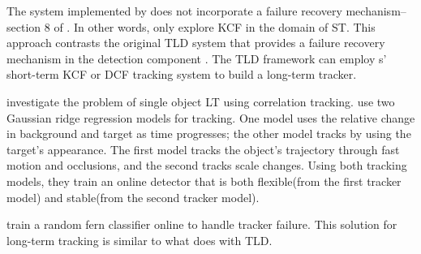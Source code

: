 The system implemented by \citeauthor{Enriques2014} does not incorporate a failure recovery mechanism--section 8 of \cite{Enriques2014}.
In other words, \citeauthor{Enriques2014} only explore KCF in the domain of ST.
This approach contrasts the original TLD system that provides a failure recovery mechanism in the detection component \cite{Kalal2011}.
The TLD framework can employ \citeauthor{Enriques2014}s' short-term KCF or DCF tracking system  to build a long-term tracker.

\citet{Ma2015Correlation} investigate the problem of single object LT using correlation tracking.
\citeauthor{Ma2015Correlation} use two Gaussian ridge regression \cite{murphy2012} models for tracking.
One model uses the relative change in background and target as time progresses; the other model tracks by using the target's appearance.
The first model tracks the object's trajectory through fast motion and occlusions, and the second tracks scale changes.
Using both tracking models, they train an online detector that is both flexible(from the first tracker model) and stable(from the second tracker model).

\citeauthor{Ma2015Correlation} train a random fern classifier \cite{ferns2007, Kalal2011} online to handle tracker failure.
This solution for long-term tracking is similar to what \citeauthor{KalalPHD} does with TLD.
